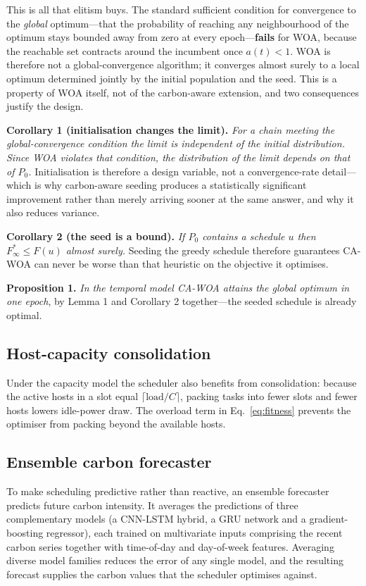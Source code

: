 \documentclass[12pt,a4paper]{article}
\providecommand{\DIFaddtex}[1]{{\protect\color{blue} \sf #1}} %
\providecommand{\DIFaddend}{} %
\providecommand{\DIFadd}[1]{\texorpdfstring{\DIFaddtex{#1}}{#1}} %
\DeclareRobustCommand{\DIFaddend}{\DIFOaddend \let\includegraphics\DIFOincludegraphics} %
\begin{document}
\vspace{2pt}\noindent \DIFadd{This is all that elitism buys. The standard sufficient condition for convergence to the
\emph{global} optimum---that the probability of reaching any neighbourhood of the optimum stays bounded away
from zero at every epoch---\textbf{fails} for WOA, because the reachable set contracts around the incumbent
once $a(t)<1$. WOA is therefore not a global-convergence algorithm; it converges almost surely to a local
optimum determined jointly by the initial population and the seed. This is a property of WOA itself, not of
the carbon-aware extension, and two consequences justify the design.
}

\vspace{2pt}\noindent\DIFadd{\textbf{Corollary 1 (initialisation changes the limit).} \emph{For a chain meeting the
global-convergence condition the limit is independent of the initial distribution. Since WOA violates that
condition, the distribution of the limit depends on that of $P_0$.} Initialisation is therefore a design
variable, not a convergence-rate detail---which is why carbon-aware seeding produces a statistically
significant improvement rather than merely arriving sooner at the same answer, and why it also reduces
variance.
}

\vspace{2pt}\noindent\DIFadd{\textbf{Corollary 2 (the seed is a bound).} \emph{If $P_0$ contains a schedule $u$ then
$F^{*}_\infty\le F(u)$ almost surely.} Seeding the greedy schedule therefore guarantees CA-WOA can never be
worse than that heuristic on the objective it optimises.
}

\vspace{2pt}\noindent\DIFadd{\textbf{Proposition 1.} \emph{In the temporal model CA-WOA attains the global optimum in
one epoch}, by Lemma 1 and Corollary 2 together---the seeded schedule is already optimal.
}

\DIFaddend \subsection{Host-capacity consolidation}
Under the capacity model the scheduler also benefits from consolidation: because the active hosts in a slot
equal $\lceil \text{load}/C \rceil$, packing tasks into fewer slots and fewer hosts lowers idle-power draw. The
overload term in Eq.~\eqref{eq:fitness} prevents the optimiser from packing beyond the available hosts.

\subsection{Ensemble carbon forecaster}
To make scheduling predictive rather than reactive, an ensemble forecaster predicts future carbon intensity. It
averages the predictions of three complementary models (a CNN-LSTM hybrid, a GRU network and a
gradient-boosting regressor), each trained on multivariate inputs comprising the recent carbon series
together with time-of-day and day-of-week features. Averaging diverse model families reduces the error of any
single model, and the resulting forecast supplies the carbon values that the scheduler optimises against.
\end{document}
